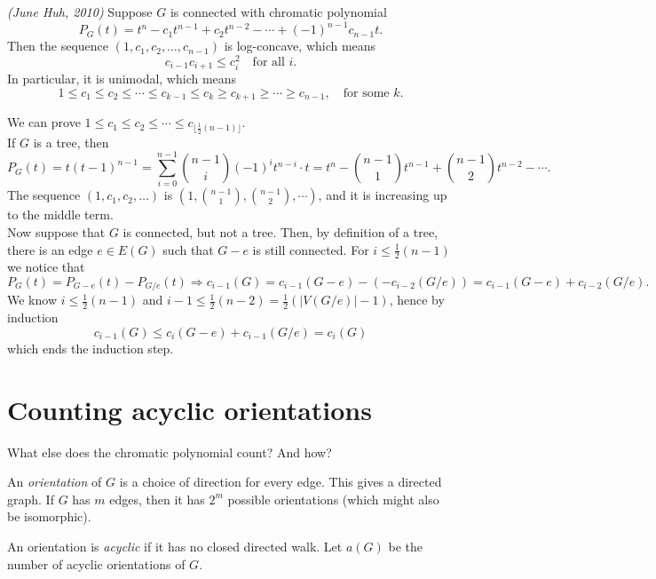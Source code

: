 \begin{theorem} \emph{(June Huh, 2010)}
Suppose $G$ is connected with chromatic polynomial
$$P_G(t)=t^n-c_1t^{n-1}+c_2t^{n-2}-\cdots +(-1)^{n-1}c_{n-1}t.$$
Then the sequence $(1,c_1,c_2,\dots,c_{n-1})$ is log-concave, which means
$$c_{i-1}c_{i+1}\leqslant c_i^2 \quad \text{for all } i.$$
In particular, it is unimodal, which means
$$1 \leqslant c_1 \leqslant c_2 \leqslant \cdots \leqslant c_{k-1} \leqslant c_k \geqslant c_{k+1} \geqslant \cdots \geqslant c_{n-1}, \quad \text{for some } k.$$
\end{theorem}


\begin{remark} We can prove $1 \leqslant c_1 \leqslant c_2 \leqslant \cdots \leqslant c_{\lfloor \frac{1}{2}(n-1)\rfloor}$.
\\ If $G$ is a tree, then
$$P_G(t)=t(t-1)^{n-1}=\sum_{i=0}^{n-1} {n-1 \choose i}(-1)^it^{n-i}\cdot t=t^n-{n-1 \choose 1}t^{n-1}+{n-1 \choose 2}t^{n-2}-\cdots.$$
The sequence $(1,c_1,c_2,\dots)$ is $(1,{n-1 \choose 1},{n-1 \choose 2},\cdots)$, and it is increasing up to the middle term.
\\ Now suppose that $G$ is connected, but not a tree. Then, by definition of a tree, there is an edge $e\in E(G)$ such that $G-e$ is still connected. For $i\leqslant \frac{1}{2}(n-1)$ we notice that
$$P_G(t)=P_{G-e}(t)-P_{G/e}(t) \Longrightarrow c_{i-1}(G)=c_{i-1}(G-e)-(-c_{i-2}(G/e))=c_{i-1}(G-e)+c_{i-2}(G/e).$$
We know $i\leqslant \frac{1}{2}(n-1)$ and $i-1 \leqslant \frac{1}{2}(n-2)=\frac{1}{2}(|V(G/e)|-1)$, hence by induction 
 $$c_{i-1}(G)\leqslant c_i(G-e)+c_{i-1}(G/e)=c_i(G)$$
which ends the induction step.
\end{remark}


\section{Counting acyclic orientations}

What else does the chromatic polynomial count? And how?

\begin{definition} An \emph{orientation} of $G$ is a choice  of direction for every edge. This gives a directed graph. If $G$ has $m$ edges, then it has $2^m$ possible orientations (which might also be isomorphic).
\end{definition}

\begin{definition} An orientation is \emph{acyclic} if it has no closed directed walk. Let $a(G)$ be the number of acyclic orientations of $G$.
\end{definition}

